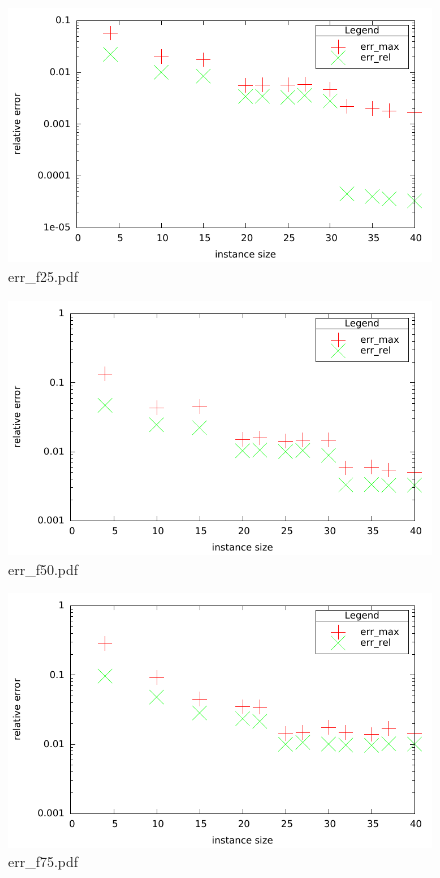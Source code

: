 \documentclass[12pt,a4paper]{article}
\begin{document}
\begin{figure}[H]
\caption{err\_f25.pdf }
\includegraphics{./err_f25.pdf}
\end{figure}

\begin{figure}[H]
\caption{err\_f50.pdf }
\includegraphics{./err_f50.pdf}
\end{figure}

\begin{figure}[H]
\caption{err\_f75.pdf }
\includegraphics{./err_f75.pdf}
\end{figure}
\end{document}
